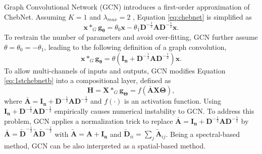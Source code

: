 	
    Graph Convolutional Network (GCN) \cite{kipf2017semi} introduces a first-order approximation of ChebNet.  Assuming $K=1$ and $\lambda_{max} = 2$
	, Equation \ref{eq:chebnet} is simplified as 
	\begin{equation}
	\label{eq:1stchebnet}
	\mathbf{x} \ast_G \mathbf{g_\theta}= \theta_0\mathbf{x}-\theta_1\mathbf{D}^{-\frac{1}{2}}\mathbf{A}\mathbf{D}^{-\frac{1}{2}}\mathbf{x}.
	\end{equation}
	To restrain the number of parameters and avoid over-fitting, GCN further assume $\theta=\theta_0=-\theta_1$,  leading to the following definition of a graph convolution,
	\begin{equation}
	\label{eq:1stchebnetb}
	\mathbf{x} \ast_G \mathbf{g_\theta} = \theta(\mathbf{I_n}+\mathbf{D}^{-\frac{1}{2}}\mathbf{A}\mathbf{D}^{-\frac{1}{2}})\mathbf{x}.
	\end{equation}
	To allow multi-channels of inputs and outputs, GCN modifies Equation \ref{eq:1stchebnetb} into a compositional layer, defined as 
	\begin{equation}
	\label{eq:1stchebnetc}
	\mathbf{H}= \mathbf{X}\ast_G \mathbf{g_\Theta} = f(\mathbf{\bar{A}}\mathbf{X} \mathbf{\Theta}),
	\end{equation} 
	where $\mathbf{\bar{A}} =\mathbf{I_n}+\mathbf{D}^{-\frac{1}{2}}\mathbf{A}\mathbf{D}^{-\frac{1}{2}}$ and $f(\cdot)$ is an activation function.  Using $\mathbf{I_n}+\mathbf{D}^{-\frac{1}{2}}\mathbf{A}\mathbf{D}^{-\frac{1}{2}}$ empirically causes numerical instability to GCN. To address this problem, GCN applies a normalization trick to replace $\mathbf{\bar{A}}=\mathbf{I_n}+\mathbf{D}^{-\frac{1}{2}}\mathbf{A}\mathbf{D}^{-\frac{1}{2}}$ by $\mathbf{\bar{A}}=\tilde{\mathbf{D}}^{-\frac{1}{2}}\tilde{\mathbf{A}}\tilde{\mathbf{D}}^{-\frac{1}{2}}$ with $\tilde{\mathbf{A}}=\mathbf{A}+\mathbf{I_n}$ and $\tilde{\mathbf{D}}_{ii}=\sum_j \tilde{\mathbf{A}}_{ij}$. 
	Being a spectral-based method, GCN can be also interpreted as a spatial-based method. 

